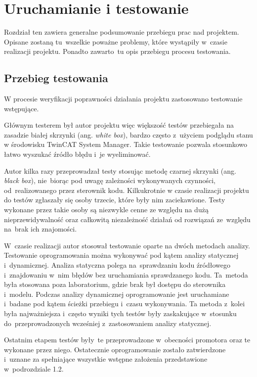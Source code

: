 \section{Uruchamianie i testowanie}
Rozdział ten zawiera generalne podsumowanie przebiegu prac nad projektem. Opisane zostaną tu~wszelkie poważne problemy, które wystąpiły w~czasie realizacji projektu. Ponadto zawarto~tu opis przebiegu procesu testowania.

\subsection{Przebieg testowania}
W procesie weryfikacji poprawności działania projektu zastosowano testowanie wstępujące. 

Głównym testerem był autor projektu więc większość testów przebiegała na zasadzie białej skrzynki (ang. \emph{white box}), bardzo często z~użyciem podglądu stanu w środowisku TwinCAT System Manager. Takie testowanie pozwala stosunkowo łatwo wyszukać źródło błędu i~je wyeliminować.

Autor kilka razy przeprowadzał testy stosując metodę czarnej skrzynki (ang. \emph{black box}), nie~biorąc pod uwagę zależności wykonywanych czynności, od~realizowanego przez sterownik kodu. Kilkukrotnie w czasie realizacji projektu do testów zgłaszały się osoby trzecie, które były nim zaciekawione. Testy wykonane przez takie osoby są niezwykle cenne ze względu na dużą nieprzewidywalność oraz całkowitą niezależność działań od rozwiązań ze~względu na~brak ich znajomości.

W~czasie realizacji autor stosował testowanie oparte na dwóch metodach analizy. Testowanie oprogramowania można wykonywać pod kątem analizy statycznej i~dynamicznej. Analiza statyczna polega na~sprawdzaniu kodu źródłowego i~znajdowaniu w~nim błędów bez uruchamiania sprawdzanego kodu. Ta~metoda była stosowana poza laboratorium, gdzie brak był dostępu do sterownika i~modelu. Podczas analizy dynamicznej oprogramowanie jest uruchamiane i~badane pod kątem ścieżki przebiegu i~czasu wykonywania. Ta metoda z~kolei była najważniejsza i~często wyniki tych testów były zaskakujące w~stosunku do~przeprowadzonych wcześniej z~zastosowaniem analizy statycznej.

Ostatnim etapem testów były~te przeprowadzone w~obecności promotora oraz te wykonane przez niego. Ostatecznie oprogramowanie zostało zatwierdzone i~uznane za spełniające wszystkie wstępne założenia przedstawione w~podrozdziale 1.2.
\newpage
